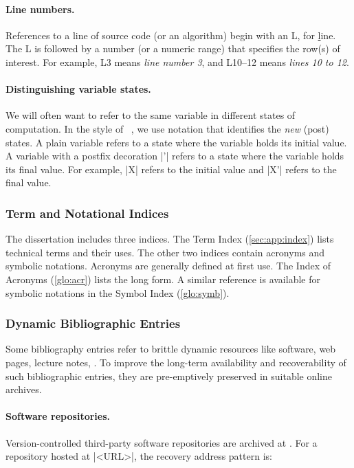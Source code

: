 \paragraph*{Line numbers.}
References to a line of source code (or an algorithm) begin with an L, for
\underline{l}ine. The L is followed by a number (or a numeric range) that
specifies the row(s) of interest. For example, L3 means \emph{line number 3},
and L10--12 means \emph{lines 10 to 12}.

\paragraph*{Distinguishing variable states.}
We will often want to refer to the same variable in different states of
computation. In the style of \emph{}~\cite{spivey1992}, we use notation that identifies the \emph{new}
(post) states. A plain variable refers to a state where the variable holds its
{initial} value. A variable with a postfix decoration \pr|'| refers to a state
where the variable holds its {final} value. For example, \pr|X| refers to the
initial value and \pr|X'| refers to the final value.

\subsubsection{Term and Notational Indices}

The dissertation includes three indices. The Term Index
(\autoref{sec:app:index}) lists technical terms and their uses. The other two
indices contain acronyms and symbolic notations. Acronyms are generally defined
at first use. The Index of Acronyms (\autoref{glo:acr}) lists the long form. A
similar reference is available for symbolic notations in the Symbol Index
(\autoref{glo:symb}).

\subsubsection{Dynamic Bibliographic Entries}
\label{sssec:dyn-bib}

Some bibliography entries refer to brittle dynamic resources like software, web
pages, lecture notes, \etc. To improve the long-term availability and
recoverability of such bibliographic entries, they are pre-emptively preserved
in suitable online archives.

\paragraph*{Software repositories.}
Version-controlled third-party software repositories are archived at
\href{https://softwareheritage.org}{}. For a repository
hosted at \pr|<URL>|, the recovery address pattern is:

